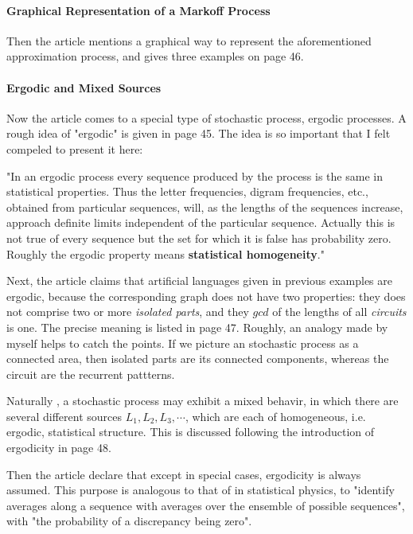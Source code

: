 \documentclass{article}
\numberwithin{equation}{subsection} %
\theoremstyle{definition}
\begin{document}
    \paragraph{Graphical Representation of a Markoff Process}
    Then the article mentions a graphical way to represent the aforementioned
    approximation process, and gives three examples on page 46.

    \paragraph{Ergodic and Mixed Sources}
    Now the article comes to a special type of stochastic process, ergodic
    processes. A rough idea of "ergodic" is given in page 45. The idea is
    so important that I felt compeled to present it here:

    "In an ergodic process every sequence produced by
    the process is the same in statistical properties. Thus the letter
    frequencies, digram frequencies, etc., obtained from particular
    sequences, will, as the lengths of the sequences increase, approach
    definite limits independent of the particular sequence.
    Actually
    this is not true of every sequence but the set for which it is false
    has probability zero. Roughly the ergodic property means 
    \textbf{statistical homogeneity}."

    Next, the article claims that artificial languages given in previous
    examples are ergodic, because the corresponding graph does not
    have two properties: they does not comprise two or more \textit{isolated
    parts}, and they $gcd$ of the lengths of all \textit{circuits }is one.
    The precise meaning is listed in page 47. Roughly, an analogy made by
    myself helps to
    catch the points. If we picture an stochastic process as a connected 
    area, then isolated parts are its connected components, whereas the
    circuit are the recurrent pattterns.

    Naturally , a stochastic process may exhibit a mixed behavir, in which
    there are several different sources $L_1,L_2,L_3,\cdots$, which are
    each of homogeneous, i.e. ergodic, statistical structure. This is
    discussed following the introduction of ergodicity in page 48.

    Then the article declare that except in special cases, ergodicity is
    always assumed. This purpose is analogous to that of in statistical
    physics, to "identify averages along a sequence with averages over 
    the ensemble of possible sequences", with "the probability of a
    discrepancy being zero".
\end{document}
